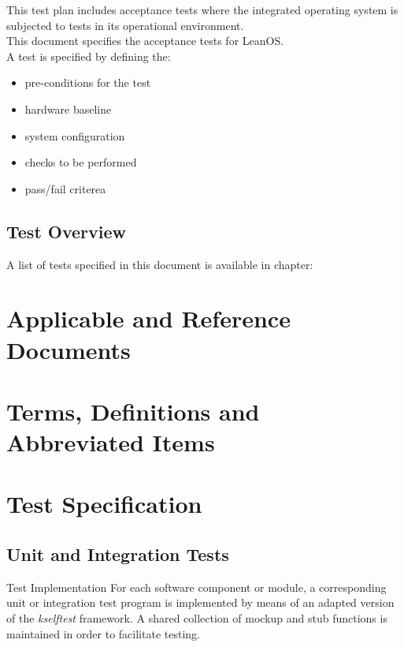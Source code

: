 \noindent
This test plan includes acceptance tests where the integrated operating
system is subjected to tests in its operational environment.\\

\noindent
This document specifies the acceptance tests for LeanOS.\\

\noindent
A test is specified by defining the:
\begin{itemize}
	\item pre-conditions for the test
	\item hardware baseline
	\item system configuration
	\item checks to be performed
	\item pass/fail criterea
\end{itemize}



\section{Test Overview}

A list of tests specified in this document is available in chapter:


\chapter{Applicable and Reference Documents} %

\printbibliography[heading=none]


\chapter{Terms, Definitions and Abbreviated Items}

\printglossary[type=acronym]
\printglossary[type=main, style=altlist]


\chapter{Test Specification}

\section{Unit and Integration Tests}

{Test Implementation}{%
For each software component or module, a corresponding unit or integration test
program is implemented by means of an adapted version of the \emph{kselftest}
framework. A shared collection of mockup and stub functions is maintained in
order to facilitate testing.
}%
{}{}

